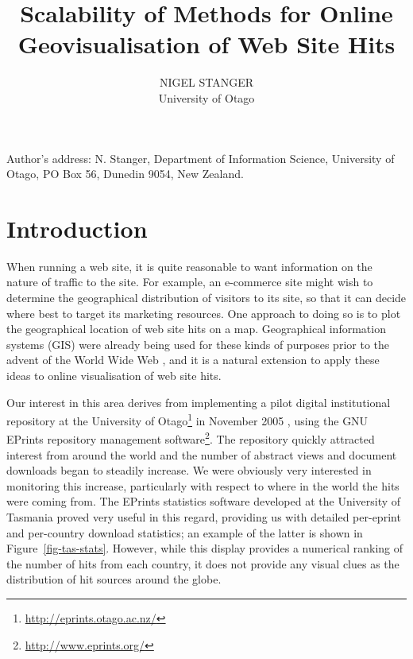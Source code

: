\documentclass[acmtocl,acmnow]{acmtrans2m}
\title{Scalability of Methods for Online Geovisualisation of Web Site Hits}
\author{NIGEL STANGER \\ University of Otago}
\begin{document}


            
\begin{bottomstuff} 
Author's address: N. Stanger, Department of Information Science,
University of Otago, PO Box 56, Dunedin 9054, New Zealand.
\end{bottomstuff}
            
\maketitle


\section{Introduction}
\label{sec-introduction}

When running a web site, it is quite reasonable to want information on
the nature of traffic to the site. For example, an e-commerce site might
wish to determine the geographical distribution of visitors to its site,
so that it can decide where best to target its marketing resources. One
approach to doing so is to plot the geographical location of web site
hits on a map. Geographical information systems (GIS) were already being
used for these kinds of purposes prior to the advent of the World Wide
Web \cite{Beau-JR-1991-GIS}, and it is a natural extension to apply
these ideas to online visualisation of web site hits.

Our interest in this area derives from implementing a pilot digital
institutional repository at the University of
Otago\footnote{\url{http://eprints.otago.ac.nz/}} in November 2005
\cite{Stan-N-2006-running}, using the GNU EPrints repository management
software\footnote{\url{http://www.eprints.org/}}. The repository quickly
attracted interest from around the world and the number of abstract
views and document downloads began to steadily increase. We were
obviously very interested in monitoring this increase, particularly with
respect to where in the world the hits were coming from. The EPrints
statistics software developed at the University of Tasmania
\cite{Sale-A-2006-stats} proved very useful in this regard, providing us
with detailed per-eprint and per-country download statistics; an example
of the latter is shown in Figure~\ref{fig-tas-stats}. However, while
this display provides a numerical ranking of the number of hits from
each country, it does not provide any visual clues as the distribution
of hit sources around the globe.
\end{document}
